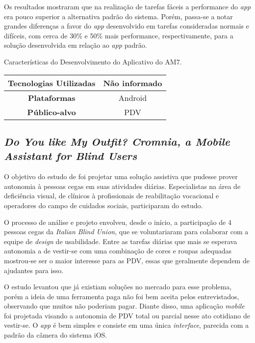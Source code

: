 Os resultados mostraram que na realização de tarefas fáceis a performance do \emph{app} era pouco superior a alternativa padrão do sistema.
Porém, passa-se a notar grandes diferenças a favor do \emph{app} desenvolvido em tarefas consideradas normais e difíceis, com cerca de 30\% e 50\% mais performance, respectivamente, para a solução desenvolvida em relação ao \emph{app} padrão.

\begin{quadro}[htb!]
  \caption{\label{qua-car-am7}Características do Desenvolvimento do Aplicativo do AM7.}
  \begin{tabular}{|c|c|}
    \hline
    \textbf{Tecnologias Utilizadas} & Não informado \\ \hline
    \textbf{Plataformas}            & Android       \\ \hline
    \textbf{Público-alvo}           & PDV           \\
    \hline
  \end{tabular}
\end{quadro}

\subsection{\emph{Do You like My Outfit? Cromnia, a Mobile Assistant for Blind Users}}

O objetivo do estudo de  foi projetar uma solução assistiva que pudesse prover autonomia à pessoas cegas em suas atividades diárias.
Especialistas na área de deficiência visual, de clínicos à profissionais de reabilitação vocacional e operadores do campo de cuidados sociais, participaram do estudo.

O processo de análise e projeto envolveu, desde o início, a participação de 4 pessoas cegas da \emph{Italian Blind Union}, que se voluntariaram para colaborar com a equipe de \emph{design} de usabilidade.
Entre as tarefas diárias que mais se esperava autonomia a de vestir-se com uma combinação de cores e roupas adequadas mostrou-se ser o maior interesse para as PDV, essas que geralmente dependem de ajudantes para isso.

O estudo levantou que já existiam soluções no mercado para esse problema, porém a ideia de uma ferramenta paga não foi bem aceita
pelos entrevistados, observando que muitos não poderiam pagar.
Diante disso, uma aplicação \emph{mobile} foi projetada visando a autonomia de PDV total ou parcial nesse ato cotidiano de vestir-se.
O \emph{app} é bem simples e consiste em uma única \emph{interface}, parecida com a padrão da câmera do sistema iOS\@.

